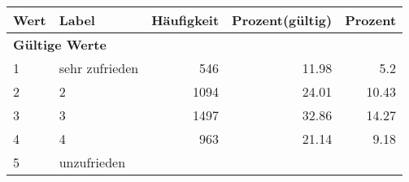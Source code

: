      \begin{longtable}{lXrrr}
     \toprule
     \textbf{Wert} & \textbf{Label} & \textbf{Häufigkeit} & \textbf{Prozent(gültig)} & \textbf{Prozent} \\
     \endhead
     \midrule
     \multicolumn{5}{l}{\textbf{Gültige Werte}}\\

     1 &
     \multicolumn{1}{X}{ sehr zufrieden   } &


       \num{546} &
       \num[round-mode=places,round-precision=2]{11,98} &
         \num[round-mode=places,round-precision=2]{5,2} \\

     2 &
     \multicolumn{1}{X}{ 2   } &


       \num{1094} &
       \num[round-mode=places,round-precision=2]{24,01} &
         \num[round-mode=places,round-precision=2]{10,43} \\

     3 &
     \multicolumn{1}{X}{ 3   } &


       \num{1497} &
       \num[round-mode=places,round-precision=2]{32,86} &
         \num[round-mode=places,round-precision=2]{14,27} \\

     4 &
     \multicolumn{1}{X}{ 4   } &


       \num{963} &
       \num[round-mode=places,round-precision=2]{21,14} &
         \num[round-mode=places,round-precision=2]{9,18} \\

     5 &
     \multicolumn{1}{X}{ unzufrieden   } &



\end{longtable}
